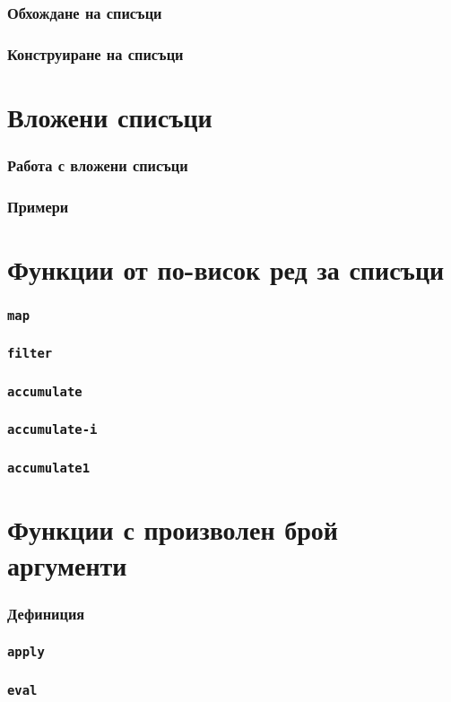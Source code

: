 \documentclass{beamer}
\begin{document}
\begin{frame}
  \frametitle{Обхождане на списъци}
\end{frame}

\begin{frame}
  \frametitle{Конструиране на списъци}
\end{frame}

\section{Вложени списъци}

\begin{frame}
  \frametitle{Работа с вложени списъци}
\end{frame}

\begin{frame}
  \frametitle{Примери}
\end{frame}

\section{Функции от по-висок ред за списъци}

\begin{frame}
  \frametitle{\tt{map}}
\end{frame}

\begin{frame}
  \frametitle{\tt{filter}}
\end{frame}

\begin{frame}
  \frametitle{\tt{accumulate}}
\end{frame}

\begin{frame}
  \frametitle{\tt{accumulate-i}}
\end{frame}

\begin{frame}
  \frametitle{\tt{accumulate1}}
\end{frame}


\section{Функции с произволен брой аргументи}

\begin{frame}
  \frametitle{Дефиниция}
\end{frame}

\begin{frame}
  \frametitle{\tt{apply}}
\end{frame}

\begin{frame}
  \frametitle{\tt{eval}}
\end{frame}
\end{document}
